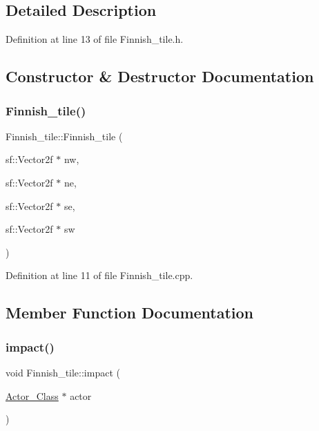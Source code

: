 \subsection{Detailed Description}


Definition at line 13 of file Finnish\+\_\+tile.\+h.



\subsection{Constructor \& Destructor Documentation}
\hypertarget{class_finnish__tile_a82be12031661ef2e48107319d76a1a30}{}\label{class_finnish__tile_a82be12031661ef2e48107319d76a1a30} 
\subsubsection{\texorpdfstring{Finnish\+\_\+tile()}{Finnish\_tile()}}
{\footnotesize\ttfamily Finnish\+\_\+tile\+::\+Finnish\+\_\+tile (\begin{DoxyParamCaption}\item[{sf\+::\+Vector2f $\ast$}]{nw,  }\item[{sf\+::\+Vector2f $\ast$}]{ne,  }\item[{sf\+::\+Vector2f $\ast$}]{se,  }\item[{sf\+::\+Vector2f $\ast$}]{sw }\end{DoxyParamCaption})}



Definition at line 11 of file Finnish\+\_\+tile.\+cpp.



\subsection{Member Function Documentation}
\hypertarget{class_finnish__tile_a04fae2c808c18027ec8b74915df33220}{}\label{class_finnish__tile_a04fae2c808c18027ec8b74915df33220} 
\subsubsection{\texorpdfstring{impact()}{impact()}}
{\footnotesize\ttfamily void Finnish\+\_\+tile\+::impact (\begin{DoxyParamCaption}\item[{\hyperlink{class_actor___class}{Actor\+\_\+\+Class} $\ast$}]{actor }\end{DoxyParamCaption})\hspace{0.3cm}{\ttfamily [virtual]}}



